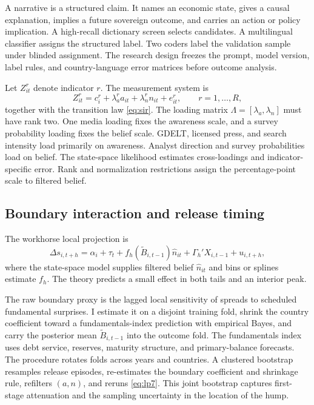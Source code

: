 \documentclass[11pt]{article}
\theoremstyle{definition}
\begin{document}
A narrative is a structured claim. It names an economic state, gives a causal explanation, implies a future sovereign outcome, and carries an action or policy implication. A high-recall dictionary screen selects candidates. A multilingual classifier assigns the structured label. Two coders label the validation sample under blinded assignment. The research design freezes the prompt, model version, label rules, and country-language error matrices before outcome analysis.

Let $Z^r_{it}$ denote indicator $r$. The measurement system is
\begin{equation}
Z^r_{it}=c^r_i+\lambda^r_a a_{it}+\lambda^r_n n_{it}+e^r_{it},
\qquad r=1,\ldots,R,
\label{eq:measurement7}
\end{equation}
together with the transition law \eqref{eq:sir}. The loading matrix $\Lambda=[\lambda_a,\lambda_n]$ must have rank two. One media loading fixes the awareness scale, and a survey probability loading fixes the belief scale. GDELT, licensed press, and search intensity load primarily on awareness. Analyst direction and survey probabilities load on belief. The state-space likelihood estimates cross-loadings and indicator-specific error. Rank and normalization restrictions assign the percentage-point scale to filtered belief.

\subsection{Boundary interaction and release timing}

The workhorse local projection is
\begin{equation}
\Delta s_{i,t+h}=\alpha_i+\tau_t+f_h(\widetilde B_{i,t-1})\widehat n_{it}
+\Gamma_h'X_{i,t-1}+u_{i,t+h},
\label{eq:lp7}
\end{equation}
where the state-space model supplies filtered belief $\widehat n_{it}$ and bins or splines estimate $f_h$. The theory predicts a small effect in both tails and an interior peak.

The raw boundary proxy is the lagged local sensitivity of spreads to scheduled fundamental surprises. I estimate it on a disjoint training fold, shrink the country coefficient toward a fundamentals-index prediction with empirical Bayes, and carry the posterior mean $\widetilde B_{i,t-1}$ into the outcome fold. The fundamentals index uses debt service, reserves, maturity structure, and primary-balance forecasts. The procedure rotates folds across years and countries. A clustered bootstrap resamples release episodes, re-estimates the boundary coefficient and shrinkage rule, refilters $(a,n)$, and reruns \eqref{eq:lp7}. This joint bootstrap captures first-stage attenuation and the sampling uncertainty in the location of the hump.
\end{document}
